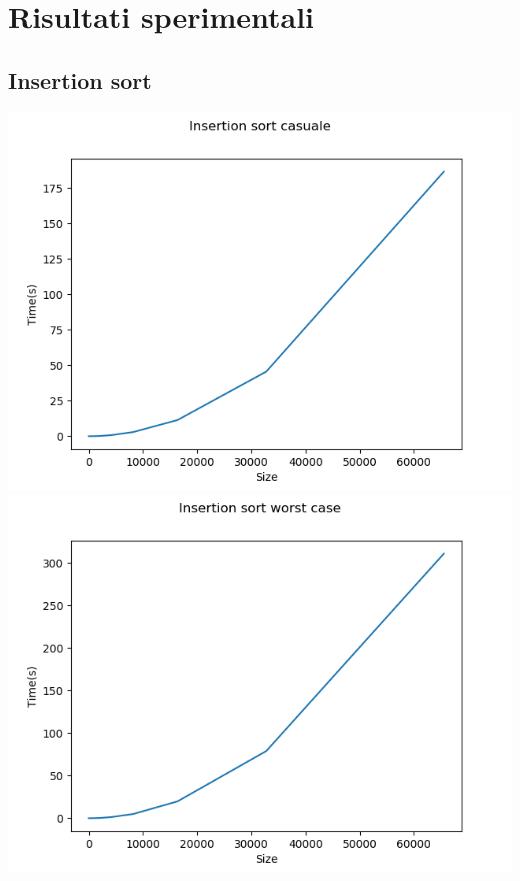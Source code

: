 \documentclass[]{article}
\begin{document}
\section{Risultati sperimentali}
\subsection{Insertion sort}
\includegraphics[scale=0.8]{InsertionSortCasuale}\\
\includegraphics[scale=0.8]{InsertionSortWorstCase}\\
\end{document}
